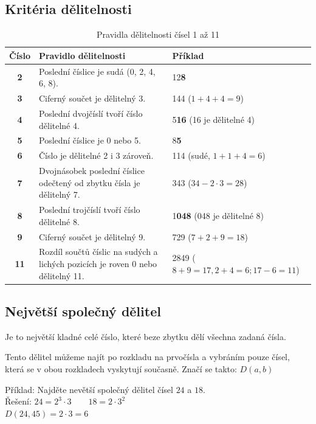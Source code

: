 \documentclass[12pt]{article}
\begin{document}
\subsection*{Kritéria dělitelnosti}
\begin{table}[H]
\centering
\renewcommand{\arraystretch}{1.3} %
\begin{tabular}{|c|p{8cm}|l|}
\hline
\textbf{Číslo} & \textbf{Pravidlo dělitelnosti} & \textbf{Příklad} \\
\hline
\textbf{2} & Poslední číslice je sudá (0, 2, 4, 6, 8). & 12\textbf{8} \\
\hline
\textbf{3} & Ciferný součet je dělitelný 3. & 144 ($1+4+4=9$) \\
\hline
\textbf{4} & Poslední dvojčíslí tvoří číslo dělitelné 4. & 5\textbf{16} (16 je dělitelné 4) \\
\hline
\textbf{5} & Poslední číslice je 0 nebo 5. & 8\textbf{5} \\
\hline
\textbf{6} & Číslo je dělitelné 2 i 3 zároveň. & 114 (sudé, $1+1+4=6$) \\
\hline
\textbf{7} & Dvojnásobek poslední číslice odečtený od zbytku čísla je dělitelný 7. & 343 ($34 - 2 \cdot 3 = 28$) \\
\hline
\textbf{8} & Poslední trojčíslí tvoří číslo dělitelné 8. & 1\textbf{048} (048 je dělitelné 8) \\
\hline
\textbf{9} & Ciferný součet je dělitelný 9. & 729 ($7+2+9=18$) \\
\hline
\textbf{11} & Rozdíl součtů číslic na sudých a lichých pozicích je roven 0 nebo dělitelný 11. & 2849 ($8+9=17, 2+4=6; 17-6=11$) \\
\hline
\end{tabular}
\caption*{Pravidla dělitelnosti čísel 1 až 11}
\label{tab:delitelnost}
\end{table}

\subsection*{Největší společný dělitel}
Je to největší kladné celé číslo, které beze zbytku dělí všechna zadaná čísla.

Tento dělitel můžeme najít po rozkladu na prvočísla a vybráním pouze čísel, která se v obou rozkladech vyskytují současně. Značí se takto: $D(a,b)$

Příklad: Najděte nevětší společný dělitel čísel $24$ a $18$.\\
Řešení: $24 = 2^3\cdot 3 \qquad 18 = 2\cdot 3^2$\\
$D(24,45) = 2 \cdot 3 = 6$
\end{document}
